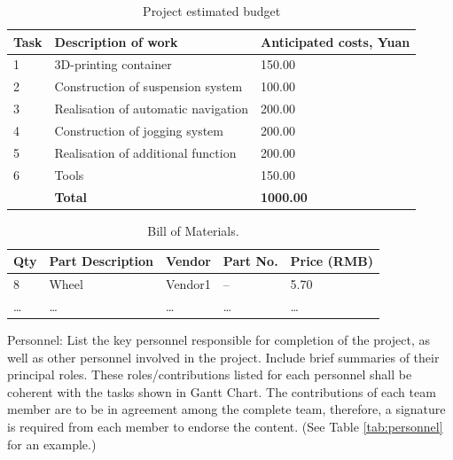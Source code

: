 \documentclass{engr1000j-s2} %
\begin{document}
  \begin{table}[h]
    \centering
    \caption{\quad Project estimated budget}
    \begin{tabular}{p{} p{} p{}}
      \toprule \textbf{Task} & \textbf{Description of work}        & \textbf{Anticipated costs, Yuan} \\
      \midrule 1             & 3D-printing container               & 150.00                           \\
      2                      & Construction of suspension system   & 100.00                           \\
      3                      & Realisation of automatic navigation & 200.00                           \\
      4                      & Construction of jogging system      & 200.00                           \\
      5                      & Realisation of additional function  & 200.00                           \\
      6                      & Tools                               & 150.00                           \\
      \midrule               & \textbf{Total}                      & \textbf{1000.00}                 \\
      \bottomrule
    \end{tabular}
    \label{tab:budget}
  \end{table}

  \begin{table}[!ht]
    \centering
    \caption{\quad Bill of Materials.}
    \begin{tabular}{p{} p{} p{} p{} p{}}
      \toprule Qty & Part Description & Vendor  & Part No. & Price (RMB) \\
      \midrule 8   & Wheel            & Vendor1 & --       & 5.70        \\
      \dots        & \dots            & \dots   & \dots    & \dots       \\
      \bottomrule
    \end{tabular}
    \label{tab:bill_of_materials}
  \end{table}

  Personnel: List the key personnel responsible for completion of the project,
  as well as other personnel involved in the project. Include brief summaries of
  their principal roles. These roles/contributions listed for each personnel
  shall be coherent with the tasks shown in Gantt Chart. The contributions of each
  team member are to be in agreement among the complete team, therefore, a signature
  is required from each member to endorse the content. (See Table \ref{tab:personnel} for an example.)
\end{document}
